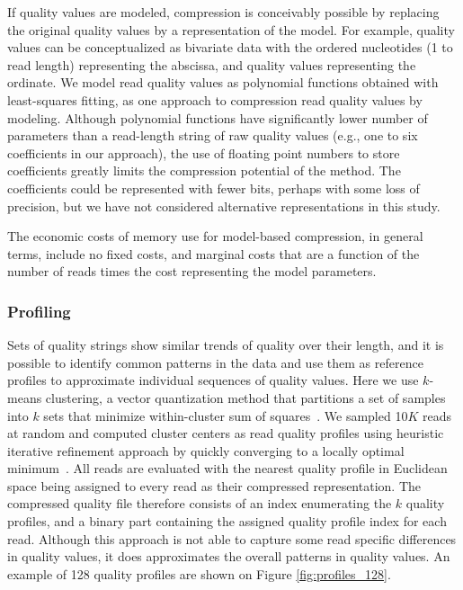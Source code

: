 \documentclass{bioinfo}
\begin{document}
\begin{methods}
If quality values are modeled, compression is conceivably possible by
replacing the original quality values by a representation of the
model. For example, quality values can be conceptualized as bivariate
data with the ordered nucleotides (1 to read length) representing the
abscissa, and quality values representing the ordinate. We model read
quality values as polynomial functions obtained with least-squares
fitting, as one approach to compression read quality values by
modeling.  Although polynomial functions have significantly lower
number of parameters than a read-length string of raw quality values
(e.g., one to six coefficients in our approach), the use of floating
point numbers to store coefficients greatly limits the compression
potential of the method. The coefficients could be represented with
fewer bits, perhaps with some loss of precision, but we have not
considered alternative representations in this study.

The economic costs of memory use for model-based compression, in
general terms, include no fixed costs, and marginal costs that are a
function of the number of reads times the cost representing the model
parameters.

\subsubsection{Profiling}

Sets of quality strings show similar trends of quality over their
length, and it is possible to identify common patterns in the data and
use them as reference profiles to approximate individual sequences of
quality values. Here we use $k$-means clustering, a vector
quantization method that partitions a set of samples into $k$ sets
that minimize within-cluster sum of
squares~\citep{macqueen1967some}. We sampled 10$K$ reads at random and
computed cluster centers as read quality profiles using heuristic
iterative refinement approach by quickly converging to a locally
optimal minimum~\citep{hartigan1979algorithm}.  All reads are
evaluated with the nearest quality profile in Euclidean space being
assigned to every read as their compressed representation.  The
compressed quality file therefore consists of an index enumerating the
$k$ quality profiles, and a binary part containing the assigned
quality profile index for each read.  Although this approach is not
able to capture some read specific differences in quality values, it
does approximates the overall patterns in quality values. An example
of 128 quality profiles are shown on Figure \ref{fig:profiles_128}.


\end{methods}
\end{document}
